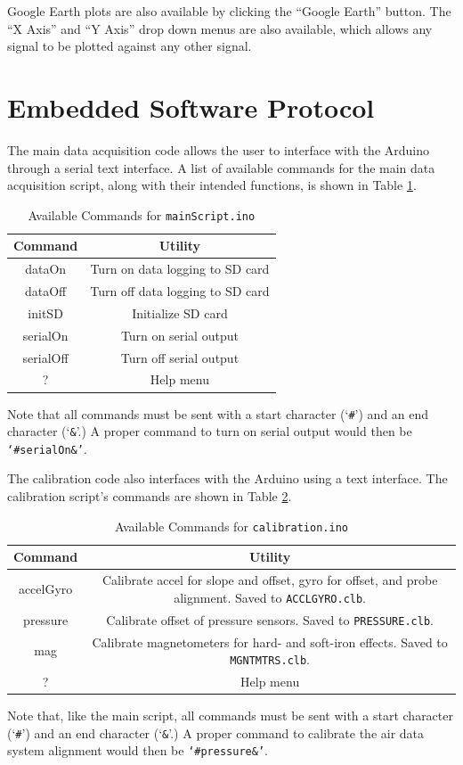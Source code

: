 Google Earth plots are also available by clicking the ``Google Earth'' button. The ``X Axis'' and ``Y Axis'' drop down menus are also available, which allows any signal to be plotted against any other signal.

\section{Embedded Software Protocol}
The main data acquisition code allows the user to interface with the Arduino through a serial text interface. A list of available commands for the main data acquisition script, along with their intended functions, is shown in Table \ref{table:mainScriptComms}.
\begin{table}[H]
\caption{Available Commands for \texttt{mainScript.ino}}
\centering
\begin{tabular}{|c | c|}
\hline
 Command & Utility\\
 \hline\hline
dataOn & Turn on data logging to SD card\\\hline
dataOff & Turn off data logging to SD card\\\hline
initSD & Initialize SD card\\\hline
serialOn & Turn on serial output\\\hline
serialOff & Turn off serial output\\\hline
? & Help menu\\\hline
\end{tabular}
\label{table:mainScriptComms}
\end{table}

Note that all commands must be sent with a start character (`\texttt{\#}') and an end character (`\texttt{\&}'.) A proper command to turn on serial output would then be \texttt{`\#serialOn\&'}.

The calibration code also interfaces with the Arduino using a text interface. The calibration script's commands are shown in Table \ref{table:calibComms}.
\begin{table}[H]
\caption{Available Commands for \texttt{calibration.ino}}
\centering
\begin{tabular}{|c | c|}
\hline
 Command & Utility\\
 \hline\hline
accelGyro & Calibrate accel for slope and offset, gyro for offset, and probe alignment. 
Saved to \texttt{ACCLGYRO.clb}.\\\hline
pressure & Calibrate offset of pressure sensors. 
Saved to \texttt{PRESSURE.clb}.\\\hline
mag & Calibrate magnetometers for hard- and soft-iron effects. 
Saved to \texttt{MGNTMTRS.clb}.\\\hline
? & Help menu\\\hline
\end{tabular}
\label{table:calibComms}
\end{table}

Note that, like the main script, all commands must be sent with a start character (`\texttt{\#}') and an end character (`\texttt{\&}'.) A proper command to calibrate the air data system alignment would then be \texttt{`\#pressure\&'}.